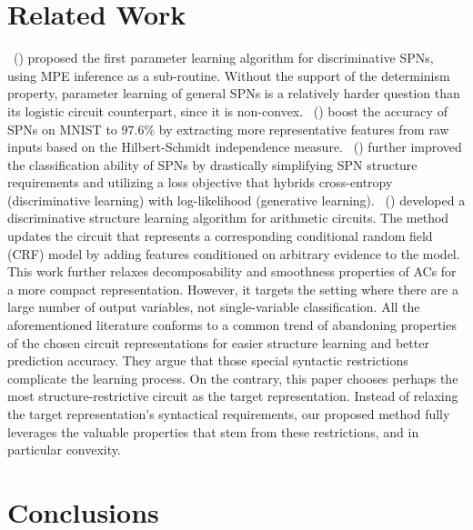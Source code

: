 \documentclass[letterpaper]{article} %
\newcommand{\citet}[1]{\citeauthor{#1}~(\citeyear{#1})}
\begin{document}
\section{Related Work}
\citet{gens2012discriminative} proposed the first parameter learning algorithm for discriminative SPNs, using MPE inference as a sub-routine. Without the support of the determinism property, parameter learning of general SPNs is a relatively harder question than its logistic circuit counterpart, since it is non-convex. \citet{adel2015learning} boost the accuracy of SPNs on MNIST to  $97.6\%$ by extracting more representative features from raw inputs based on the Hilbert-Schmidt independence measure.
\citet{rat-spn2018} further improved the  classification ability of SPNs by drastically simplifying SPN structure requirements and utilizing a loss objective that hybrids cross-entropy (discriminative learning) with log-likelihood (generative learning).  \citet{rooshenas2016discriminative} developed a discriminative structure learning algorithm for arithmetic circuits. The method updates the circuit that represents a corresponding conditional random field (CRF) model by adding features conditioned on arbitrary evidence to the model. This work further relaxes decomposability and smoothness properties of ACs for a more compact representation. However, it targets the setting where there are a large number of output variables, not single-variable classification.  All the aforementioned literature conforms to a common trend of abandoning properties of the chosen circuit representations for easier structure learning and better prediction accuracy. They argue that those special syntactic restrictions complicate the learning process. On the contrary, this paper chooses perhaps the most structure-restrictive circuit as the target representation. Instead of relaxing the target representation's syntactical requirements, our proposed method fully leverages the valuable properties that stem from these restrictions, and in particular convexity.

\vspace{-1.04mm}
\section{Conclusions}
\end{document}
